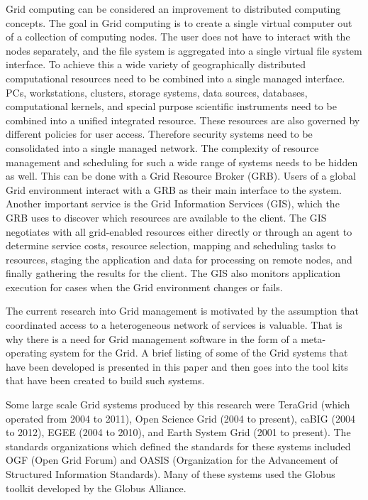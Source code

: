 \documentclass[conference]{IEEEtran}
\begin{document}
Grid computing can be considered an improvement to distributed computing concepts. The goal in Grid computing is to create a single virtual computer out of a collection of computing nodes. The user does not have to interact with the nodes separately, and the file system is aggregated into a single virtual file system interface. \cite{globus} To achieve this a wide variety of geographically distributed computational resources need to be combined into a single managed interface. PCs, workstations, clusters, storage systems, data sources, databases, computational kernels, and special purpose scientific instruments need to be combined into a unified integrated resource. These resources are also governed by different policies for user access. Therefore security systems need to be consolidated into a single managed network. The complexity of resource management and scheduling for such a wide range of systems needs to be hidden as well. This can be done with a Grid Resource Broker (GRB). Users of a global Grid environment interact with a GRB as their main interface to the system. Another important service is the Grid Information Services (GIS), which the GRB uses to discover which resources are available to the client. The GIS negotiates with all grid-enabled resources either directly or through an agent to determine service costs, resource selection, mapping and scheduling tasks to resources, staging the application and data for processing on remote nodes, and finally gathering the results for the client. The GIS also monitors application execution for cases when the Grid environment changes or fails. \cite{economygrid} 

The current research into Grid management is motivated by the assumption that coordinated access to a heterogeneous network of services is valuable. That is why there is a need for Grid management software in the form of a meta-operating system for the Grid. A brief listing of some of the Grid systems that have been developed is presented in this paper and then goes into the tool kits that have been created to build such systems. 

Some large scale Grid systems produced by this research were TeraGrid (which operated from 2004 to 2011), Open Science Grid (2004 to present), caBIG (2004 to 2012), EGEE (2004 to 2010), and Earth System Grid (2001 to present). The standards organizations which defined the standards for these systems included OGF (Open Grid Forum) and OASIS (Organization for the Advancement of Structured Information Standards). Many of these systems used the Globus toolkit developed by the Globus Alliance. 
\end{document}
